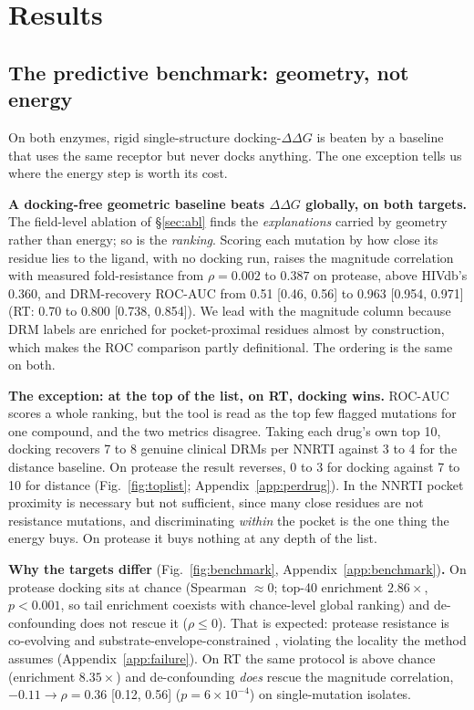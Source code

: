 \documentclass{article}
\newcommand{\ddg}{\ensuremath{\Delta\Delta G}}
\newcommand{\rhoo}{\ensuremath{\rho}}
\begin{document}
\section{Results}

\subsection{The predictive benchmark: geometry, not energy}
\label{sec:pred}
On both enzymes, rigid single-structure docking-\ddg{} is beaten by a baseline that uses the same receptor but never docks anything. The one exception tells us where the energy step is worth its cost.

\textbf{A docking-free geometric baseline beats \ddg{} globally, on both targets.} The field-level ablation of \S\ref{sec:abl} finds the \emph{explanations} carried by geometry rather than energy; so is the \emph{ranking}. Scoring each mutation by how close its residue lies to the ligand, with no docking run, raises the magnitude correlation with measured fold-resistance from $\rhoo=0.002$ to $0.387$ on protease, above HIVdb's 0.360, and DRM-recovery ROC-AUC from 0.51 [0.46, 0.56] to 0.963 [0.954, 0.971] (RT: 0.70 to 0.800 [0.738, 0.854]). We lead with the magnitude column because DRM labels are enriched for pocket-proximal residues almost by construction, which makes the ROC comparison partly definitional. The ordering is the same on both.

\textbf{The exception: at the top of the list, on RT, docking wins.} ROC-AUC scores a whole ranking, but the tool is read as the top few flagged mutations for one compound, and the two metrics disagree. Taking each drug's own top 10, docking recovers 7 to 8 genuine clinical DRMs per NNRTI against 3 to 4 for the distance baseline. On protease the result reverses, 0 to 3 for docking against 7 to 10 for distance (Fig.~\ref{fig:toplist}; Appendix~\ref{app:perdrug}). In the NNRTI pocket proximity is necessary but not sufficient, since many close residues are not resistance mutations, and discriminating \emph{within} the pocket is the one thing the energy buys. On protease it buys nothing at any depth of the list.

\textbf{Why the targets differ} (Fig.~\ref{fig:benchmark}, Appendix~\ref{app:benchmark})\textbf{.} On protease docking sits at chance (Spearman $\approx 0$; top-40 enrichment $2.86\times$, $p<0.001$, so tail enrichment coexists with chance-level global ranking) and de-confounding does not rescue it ($\rhoo \leq 0$). That is expected: protease resistance is co-evolving and substrate-envelope-constrained \citep{king2004,nalam2010}, violating the locality the method assumes (Appendix~\ref{app:failure}). On RT the same protocol is above chance (enrichment $8.35\times$) and de-confounding \emph{does} rescue the magnitude correlation, $-0.11 \to \rhoo=0.36$ [0.12, 0.56] ($p=6\times10^{-4}$) on single-mutation isolates.
\end{document}
